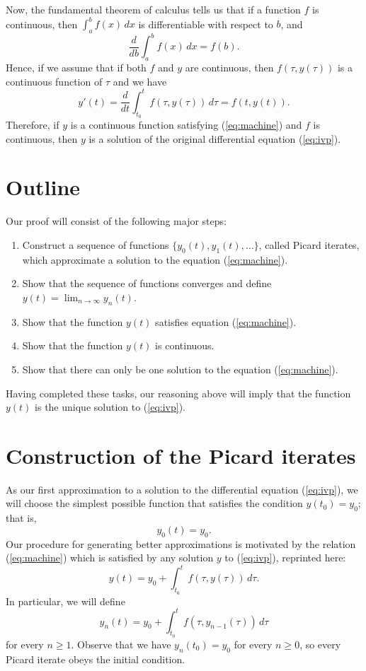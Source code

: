 \documentclass{myart}
\newcommand{\eq}[1]{(\ref{eq:#1})}
\begin{document}
Now, the fundamental theorem of calculus tells us that if a function
$f$ is continuous, then $\int_a^b f(x)\,dx$ is differentiable with
respect to $b$, and
\begin{equation*}
\frac{d}{db} \int_a^b f(x) \,dx = f(b).
\end{equation*}
Hence, if we assume that if both $f$ and $y$ are continuous, then
$f(\tau, y(\tau))$ is a continuous function of $\tau$ and we have
\begin{equation*}
y'(t) = \frac{d}{dt} \int_{t_0}^t f(\tau, y(\tau)) \,d\tau = f(t, y(t)).
\end{equation*}
Therefore, if $y$ is a continuous function satisfying \eq{machine} and
$f$ is continuous, then $y$ is a solution of the original differential
equation \eq{ivp}.

\section{Outline}

Our proof will consist of the following major steps:
\begin{enumerate}[label=(\alph*)]
\item Construct a sequence of functions $\{y_0(t), y_1(t), \ldots\}$,
  called Picard iterates, which approximate a solution to the equation
  \eq{machine}.
\item Show that the sequence of functions converges and define $y(t) =
  \lim_{n \to \infty} y_n(t)$.
\item Show that the function $y(t)$ satisfies equation \eq{machine}.
\item Show that the function $y(t)$ is continuous.
\item Show that there can only be one solution to the equation
  \eq{machine}.
\end{enumerate}
Having completed these tasks, our reasoning above will imply that the
function $y(t)$ is the unique solution to \eq{ivp}.

\section{Construction of the Picard iterates}

As our first approximation to a solution to the differential equation
\eq{ivp}, we will choose the simplest possible function that satisfies
the condition $y(t_0) = y_0$; that is,
\begin{equation*}
y_0(t) = y_0.
\end{equation*}
Our procedure for generating better approximations is motivated by the
relation \eq{machine} which is satisfied by any solution $y$ to
\eq{ivp}, reprinted here:
\begin{equation*}
y(t) = y_0 + \int_{t_0}^t f(\tau, y(\tau)) \,d\tau.
\end{equation*}
In particular, we will define
\begin{equation} \label{eq:picard}
y_n(t) = y_0 + \int_{t_0}^t f(\tau, y_{n-1}(\tau)) \,d\tau
\end{equation}
for every $n \geq 1$. Observe that we have $y_n(t_0) = y_0$ for every
$n \geq 0$, so every Picard iterate obeys the initial condition.
\end{document}
